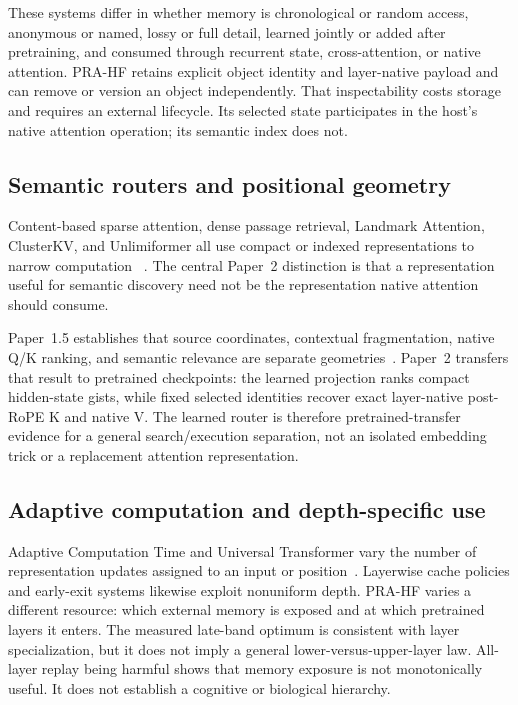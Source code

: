 \documentclass[11pt]{article}
\begin{document}
These systems differ in whether memory is chronological or random access, anonymous or named,
lossy or full detail, learned jointly or added after pretraining, and consumed through recurrent
state, cross-attention, or native attention. PRA-HF retains explicit object identity and
layer-native payload and can remove or version an object independently. That inspectability
costs storage and requires an external lifecycle. Its selected state participates in the host's
native attention operation; its semantic index does not.

\subsection{Semantic routers and positional geometry}

Content-based sparse attention, dense passage retrieval, Landmark Attention, ClusterKV, and
Unlimiformer all use compact or indexed representations to narrow computation
~\cite{roy2021routing,karpukhin2020dpr,mohtashami2023landmark,liu2024clusterkv,
bertsch2023unlimiformer}. The central Paper~2 distinction is that a representation useful for
semantic discovery need not be the representation native attention should consume.

Paper~1.5 establishes that source coordinates, contextual fragmentation, native Q/K ranking,
and semantic relevance are separate geometries~\cite{simao2026position}. Paper~2 transfers that
result to pretrained checkpoints: the learned projection ranks compact hidden-state gists, while
fixed selected identities recover exact layer-native post-RoPE K and native V. The learned
router is therefore pretrained-transfer evidence for a general search/execution separation, not
an isolated embedding trick or a replacement attention representation.

\subsection{Adaptive computation and depth-specific use}

Adaptive Computation Time and Universal Transformer vary the number of representation updates
assigned to an input or position~\cite{graves2016adaptive,dehghani2019universal}. Layerwise
cache policies and early-exit systems likewise exploit nonuniform depth. PRA-HF varies a
different resource: which external memory is exposed and at which pretrained layers it enters.
The measured late-band optimum is consistent with layer specialization, but it does not imply a
general lower-versus-upper-layer law. All-layer replay being harmful shows that memory exposure
is not monotonically useful. It does not establish a cognitive or biological hierarchy.
\end{document}
